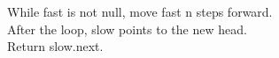 \documentclass[preview]{standalone}
\begin{document}
While fast is not null, move fast n steps forward.\\After the loop, slow points to the new head.\\Return slow.next.\\
\end{document}
